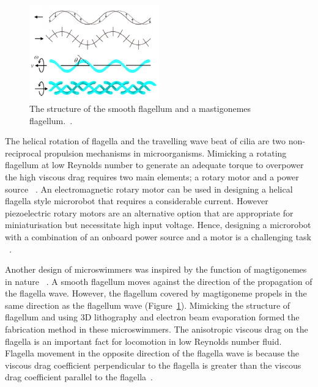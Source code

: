 \documentclass[12pt,a4paper,titlepage]{report}
\begin{document}
\paragraph{}

\begin{figure}
  \begin{center}
    \includegraphics[width=0.5\textwidth]{10}
  \caption{ The structure of the smooth flagellum and a mastigonemes flagellum.~\citep{gao2013bioinspired}.}
  \label{10}
\end{center}
\end{figure}

The helical rotation of flagella and the travelling wave beat of cilia are two non-reciprocal propulsion
 mechanisms in microorganisms. Mimicking a rotating flagellum at low Reynolds number to generate an 
adequate torque to overpower the high viscous drag requires two main elements; a rotary motor and a
 power source ~\citep{qiunanohelices}. 
An electromagnetic rotary motor can be used in designing a helical flagella style microrobot that 
requires a considerable current. However piezoelectric rotary motors are an alternative option 
that are appropriate for miniaturisation but necessitate high input voltage.  Hence, designing a microrobot with a 
combination of an onboard power source and a motor is a challenging task ~\citep{qiunanohelices}.

Another design of microswimmers was inspired by the function of magtigonemes in nature ~\citep{tottori2013artificial}.
 A smooth flagellum moves against the direction of the propagation of the flagella wave. However, 
the flagellum covered by magtigoneme propels in the same direction as the flagellum wave (Figure~\ref{10}). Mimicking 
the structure of flagellum and using 3D lithography and electron beam evaporation formed the fabrication 
method in these microswimmers.
The anisotropic viscous drag on the flagella is an important fact for locomotion in low Reynolds number fluid. 
Flagella movement in the opposite direction of the flagella wave is because the 
viscous drag coefficient perpendicular to the flagella is greater than the viscous drag coefficient parallel to 
the flagella~\citep{tottori2013artificial}. 
\end{document}
